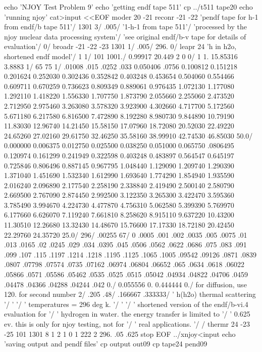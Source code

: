 \small
\begin{ccode}

echo 'NJOY Test Problem 9'
echo 'getting endf tape 511'
cp ../t511 tape20
echo 'running njoy'
cat>input <<EOF
 moder
 20 -21
 reconr
 -21 -22
 'pendf tape for h-1 from endf/b tape 511'/
 1301 3/
 .005/
 '1-h-1 from tape 511'/
 'processed by the njoy nuclear data processing system'/
 'see original endf/b-v tape for details of evaluation'/
 0/
 broadr
 -21 -22 -23
 1301 1/
 .005/
 296.
 0/
 leapr
 24
 'h in h2o, shortened endf model'/
 1 1/
  101 1001./
  0.99917 20.449 2 0 0/
  1 1. 15.85316 3.8883 1/
 65 75 1/
  .01008 .015 .0252 .033 0.050406
  .0756 0.100812 0.151218 0.201624 0.252030 0.302436 0.352842
  0.403248 0.453654 0.504060 0.554466 0.609711 0.670259 0.736623
  0.809349 0.889061 0.976435 1.072130 1.177080 1.292110 1.418220
  1.556330 1.707750 1.873790 2.055660 2.255060 2.473520 2.712950
  2.975460 3.263080 3.578320 3.923900 4.302660 4.717700 5.172560
  5.671180 6.217580 6.816500 7.472890 8.192280 8.980730 9.844890
  10.79190 11.83030 12.96740 14.21450 15.58150 17.07960 18.72080
  20.52030 22.49220 24.65260 27.02160 29.61750 32.46250 35.58160
  38.99910 42.74530 46.85030 50.0/
  0.000000 0.006375 0.012750 0.025500 0.038250 0.051000 0.065750
  .0806495 0.120974 0.161299 0.241949 0.322598 0.403248 0.483897
  0.564547 0.645197 0.725846 0.806496 0.887145 0.967795 1.048440
  1.129090 1.209740 1.290390 1.371040 1.451690 1.532340 1.612990
  1.693640 1.774290 1.854940 1.935590 2.016240 2.096890 2.177540
  2.258190 2.338840 2.419490 2.500140 2.580790 2.669500 2.767090
  2.874450 2.992500 3.122350 3.265300 3.422470 3.595360 3.785490
  3.994670 4.224730 4.477870 4.756310 5.062580 5.399390 5.769970
  6.177660 6.626070 7.119240 7.661810 8.258620 8.915110 9.637220
  10.43200 11.30510 12.26680 13.32430 14.48670 15.76600 17.17330
  18.72180 20.42450 22.29760 24.35720 25.0/
 296/
  .00255 67/
    0 .0005 .001 .002 .0035 .005 .0075 .01 .013 .0165 .02 .0245
    .029 .034 .0395 .045 .0506 .0562 .0622 .0686 .075 .083 .091
    .099 .107 .115 .1197 .1214 .1218 .1195 .1125 .1065 .1005 .09542
    .09126 .0871 .0839 .0807 .07798 .07574 .0735 .07162 .06974
    .06804 .06652 .065 .0634 .0618 .06022 .05866 .0571 .05586
    .05462 .0535 .0525 .0515 .05042 .04934 .04822 .04706 .0459
    .04478 .04366 .04288 .04244 .042 0./
 0.055556 0. 0.444444 0./  for diffusion, use 120. for second number
  2/
  .205 .48/
  .166667 .333333/
 ' h(h2o) thermal scattering '/
 ' '/
 ' temperatures = 296 deg k. '/
 ' '/
 ' shortened version of the endf/b-vi.4 evaluation for '/
 ' hydrogen in water.  the energy transfer is limited to '/
 ' 0.625 ev.  this is only for njoy testing, not for '/
 ' real applications. '/
 /
 thermr
 24 -23 -25
 101 1301 8 1 2 1 0 1 222 2
 296.
 .05 .625
stop
EOF
../xnjoy<input
echo 'saving output and pendf files'
cp output out09
cp tape24 pend09

\end{ccode}
\normalsize

